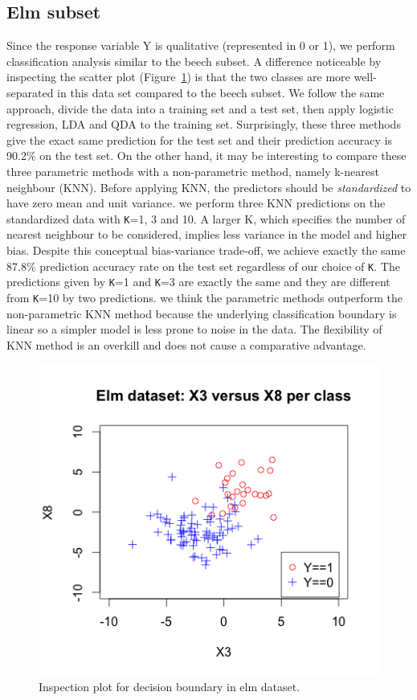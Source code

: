 \documentclass{article}
\begin{document}
\subsection{Elm subset}

Since the response variable Y is qualitative (represented in 0 or 1), we perform classification analysis similar to the beech subset. A difference noticeable by inspecting the scatter plot (Figure~\ref{fig:05-elm}) is that the two classes are more well-separated in this data set compared to the beech subset. We follow the same approach, divide the data into a training set and a test set, then apply logistic regression, LDA and QDA to the training set. Surprisingly, these three methods give the exact same prediction for the test set and their prediction accuracy is 90.2\% on the test set. On the other hand, it may be interesting to compare these three parametric methods with a non-parametric method, namely k-nearest neighbour (KNN). Before applying KNN, the predictors should be {\em standardized} to have zero mean and unit variance. we perform three KNN predictions on the standardized data with {\tt K}=1, 3 and 10. A larger K, which specifies the number of nearest neighbour to be considered, implies less variance in the model and higher bias. Despite this conceptual bias-variance trade-off, we achieve exactly the same 87.8\% prediction accuracy rate on the test set regardless of our choice of {\tt K}. The predictions given by {\tt K}=1 and {\tt K}=3 are exactly the same and they are different from {\tt K}=10 by two predictions. we think the parametric methods outperform the non-parametric KNN method because the underlying classification boundary is linear so a simpler model is less prone to noise in the data. The flexibility of KNN method is an overkill and does not cause a comparative advantage.

\begin{figure}[h!]
  \includegraphics[width=\linewidth]{project/images/05-elm.png}
  \caption{Inspection plot for decision boundary in elm dataset.}
  \label{fig:05-elm}
\end{figure}
\end{document}
